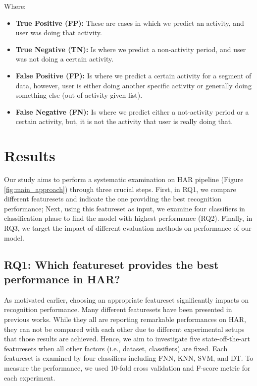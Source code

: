 \documentclass[journal,article,submit,moreauthors,pdftex]{Definitions/mdpi}
\begin{document}
Where:
\begin{itemize}
	
	\item \textbf{True Positive (FP):} These are cases in which we predict an activity, and user was doing that activity.
	
	\item \textbf{True Negative (TN):} Is where we predict a non-activity period, and user was not doing a certain activity.
	
	\item \textbf{False Positive (FP):} Is where we predict a certain activity for a segment of data, however, user is either doing another specific activity or generally doing something else (out of activity given list).
	
	\item \textbf{False Negative (FN):} Is where we predict either a not-activity period or a certain activity, but, it is not the activity that user is really doing that.
	
\end{itemize}

\section{Results}
Our study aims to perform a systematic examination on HAR pipeline (Figure \ref{fig:main_approach}) through three crucial steps. First, in RQ1, we compare different featuresets and indicate the one providing the best recognition performance; Next, using this featureset as input, we examine four classifiers in classification phase to find the model with highest performance (RQ2). Finally, in RQ3,  we target the impact of different evaluation methods on performance of our model.

\subsection{RQ1: Which featureset provides the best performance in HAR?}

As motivated earlier, choosing an appropriate featureset significantly impacts on recognition performance. Many different featuresets have been presented in previous works. While they all are reporting remarkable performances on HAR, they can not be compared with each other due to different experimental setups that those results are achieved. Hence, we aim to investigate five state-off-the-art featuresets when all other factors (i.e., dataset, classifiers) are fixed. Each featureset is examined by four classifiers including FNN, KNN, SVM, and DT. To measure the performance, we used 10-fold cross validation and F-score metric for each experiment.
\end{document}

